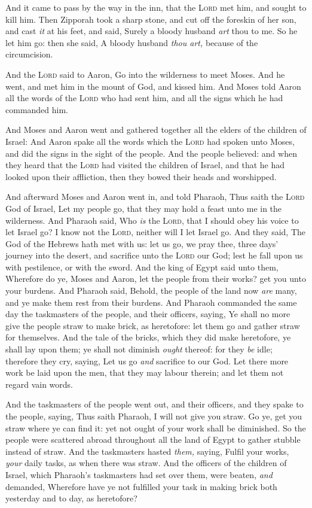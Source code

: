 \documentclass[11pt,letterpaper,oneside]{memoir}
\begin{document}
And it came to pass by the way in the inn, that the \textsc{Lord} met
him, and sought to kill him. Then Zipporah took a sharp stone, and cut
off the foreskin of her son, and cast \emph{it} at his feet, and said,
Surely a bloody husband \emph{art} thou to me. So he let him go: then
she said, A bloody husband \emph{thou art,} because of the circumcision.

And the \textsc{Lord} said to Aaron, Go into the wilderness to meet
Moses. And he went, and met him in the mount of God, and kissed him. And
Moses told Aaron all the words of the \textsc{Lord} who had sent him,
and all the signs which he had commanded him.

And Moses and Aaron went and gathered together all the elders of the
children of Israel: And Aaron spake all the words which the
\textsc{Lord} had spoken unto Moses, and did the signs in the sight of
the people. And the people believed: and when they heard that the
\textsc{Lord} had visited the children of Israel, and that he had looked
upon their affliction, then they bowed their heads and worshipped.

And afterward Moses and Aaron went in, and told Pharaoh, Thus saith the
\textsc{Lord} God of Israel, Let my people go, that they may hold a
feast unto me in the wilderness. And Pharaoh said, Who \emph{is} the
\textsc{Lord}, that I should obey his voice to let Israel go? I know not
the \textsc{Lord}, neither will I let Israel go. And they said, The God
of the Hebrews hath met with us: let us go, we pray thee, three days'
journey into the desert, and sacrifice unto the \textsc{Lord} our God;
lest he fall upon us with pestilence, or with the sword. And the king of
Egypt said unto them, Wherefore do ye, Moses and Aaron, let the people
from their works? get you unto your burdens. And Pharaoh said, Behold,
the people of the land now \emph{are} many, and ye make them rest from
their burdens. And Pharaoh commanded the same day the taskmasters of the
people, and their officers, saying, Ye shall no more give the people
straw to make brick, as heretofore: let them go and gather straw for
themselves. And the tale of the bricks, which they did make heretofore,
ye shall lay upon them; ye shall not diminish \emph{ought} thereof: for
they \emph{be} idle; therefore they cry, saying, Let us go \emph{and}
sacrifice to our God. Let there more work be laid upon the men, that
they may labour therein; and let them not regard vain words.

And the taskmasters of the people went out, and their officers, and they
spake to the people, saying, Thus saith Pharaoh, I will not give you
straw. Go ye, get you straw where ye can find it: yet not ought of your
work shall be diminished. So the people were scattered abroad throughout
all the land of Egypt to gather stubble instead of straw. And the
taskmasters hasted \emph{them,} saying, Fulfil your works, \emph{your}
daily tasks, as when there was straw. And the officers of the children
of Israel, which Pharaoh's taskmasters had set over them, were beaten,
\emph{and} demanded, Wherefore have ye not fulfilled your task in making
brick both yesterday and to day, as heretofore?
\end{document}
